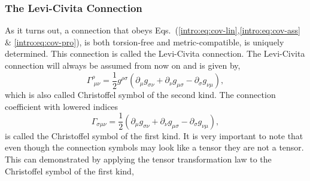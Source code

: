 \subsubsection{The Levi-Civita Connection}
As it turns out, a connection that obeys Eqs.~(\ref{intro:eq:cov-lin},\ref{intro:eq:cov-ass} $\&$ \ref{intro:eq:cov-pro}), is both torsion-free and metric-compatible, is uniquely determined. This connection is called the Levi-Civita connection. The Levi-Civita connection will always be assumed from now on and is given by, 
\begin{equation} \label{intro:eq:christoffel_def}
\Gamma^\rho_{\,\,\mu\nu} = \frac{1}{2}g^{\rho\sigma} ( \partial_{\mu} g_{\sigma\nu} + \partial_{\nu} g_{\mu\sigma} - \partial_{\sigma} g_{\nu\mu} ),
\end{equation}
which is also called Christoffel symbol of the second kind. The connection coefficient with lowered indices
\begin{equation}
\Gamma_{\sigma\mu\nu} = \frac{1}{2}( \partial_{\mu} g_{\sigma\nu} + \partial_{\nu} g_{\mu\sigma} - \partial_{\sigma} g_{\nu\mu} ),
\end{equation}
is called the Christoffel symbol of the first kind. It is very important to note that even though the connection symbols may look like a tensor they are not a tensor. This can demonstrated by applying the tensor transformation law to the Christoffel symbol of the first kind,
